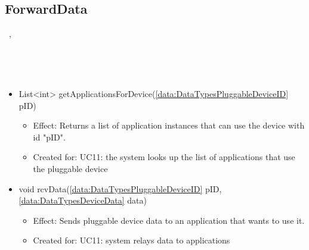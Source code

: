   \subsection{ForwardData}\label{int:OnlineServiceOnlineServiceApplicationManagerApplicationManagementLogicForwardData}
    \begin{description}
      \item[Provided by:] \iconcomponent{}~, \iconcomponent{}~
      \item[Required by:] \iconcomponent{}~
      \item[Operations:] ~
    \begin{itemize}[noitemsep,nolistsep,leftmargin=-.25cm]
      \item \textsf{List\textless{}int\textgreater{} getApplicationsForDevice(\ref{data:DataTypesPluggableDeviceID} pID)}
        \begin{itemize}[noitemsep,nolistsep]
           \item Effect: Returns a list of application instances that can use the device with id "pID".
\item Created for: UC11: the system looks up the list of applications that use the pluggable device
        \end{itemize}
      \item \textsf{void rcvData(\ref{data:DataTypesPluggableDeviceID} pID, \ref{data:DataTypesDeviceData} data)}
        \begin{itemize}[noitemsep,nolistsep]
           \item Effect: Sends pluggable device data to an application that wants to use it.
\item Created for: UC11: system relays data to applications
        \end{itemize}
    \end{itemize}
    \end{description}


